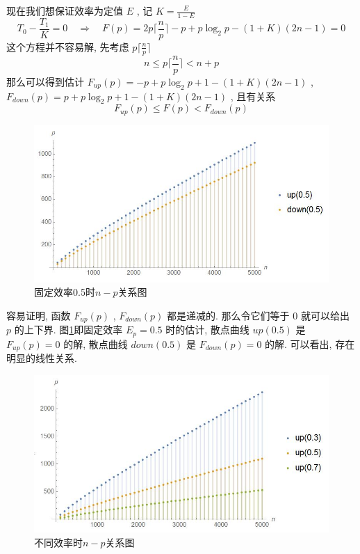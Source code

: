 \documentclass[a4paper, UTF8]{ctexart}				%
\numberwithin{equation}{section}				%
\begin{document}
        现在我们想保证效率为定值 $E$ , 记 $K = \frac{E}{1 - E}$
        $$
                T_0 - \frac{T_1}{K} = 0 
                \quad \Rightarrow \quad
                F(p) = 2p \lceil \frac{n}{p} \rceil - p + p\log_2 p - (1 + K)(2n - 1) = 0
        $$
        这个方程并不容易解, 先考虑 $p \lceil \frac{n}{p} \rceil$
        \[
            n \le p \lceil \frac{n}{p} \rceil < n + p
        \]
        那么可以得到估计 $F_{up}(p) = -p + p\log_2 p + 1 - (1 + K)(2n - 1)$ , $F_{down}(p) = p + p\log_2 p + 1  - (1 + K)(2n - 1)$ , 且有关系
        \[
            F_{up}(p) \le F(p) < F_{down}(p)
        \]

        \begin{figure}[h]\small\centering
            \includegraphics[width=12cm]{1.jpg}\caption{固定效率0.5时$n-p$关系图}\label{fig:1}
        \end{figure}
        
        容易证明, 函数 $F_{up}(p)$ , $F_{down}(p)$ 都是递减的. 那么令它们等于 $0$ 就可以给出 $p$ 的上下界. 图\ref{fig:1}即固定效率 $E_p = 0.5$ 时的估计, 散点曲线 $up(0.5)$ 是 $F_{up}(p) = 0$ 的解, 散点曲线 $down(0.5)$ 是 $F_{down}(p) = 0$ 的解. 可以看出, 存在明显的线性关系.

        \begin{figure}[h]\small\centering
            \includegraphics[width=12cm]{2.jpg}\caption{不同效率时$n-p$关系图}\label{fig:2}
        \end{figure}
\end{document}
